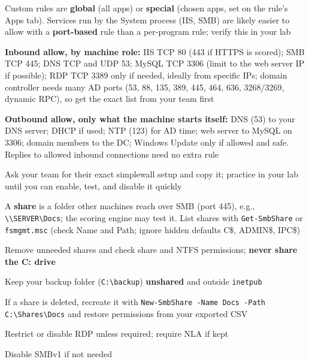 \documentclass[11pt]{article}
\newcommand{\cmd}[1]{\texttt{\small #1}}
\begin{document}
\begin{mycheck}
\begin{itemize}[itemsep=1pt, topsep=1pt]
  \end{itemize}
  \item Custom rules are \textbf{global} (all apps) or \textbf{special} (chosen apps, set on the rule's Apps tab). Services run by the System process (IIS, SMB) are likely easier to allow with a \textbf{port-based} rule than a per-program rule; verify this in your lab
  \item \textbf{Inbound allow, by machine role:} IIS TCP 80 (443 if HTTPS is scored); SMB TCP 445; DNS TCP and UDP 53; MySQL TCP 3306 (limit to the web server IP if possible); RDP TCP 3389 only if needed, ideally from specific IPs; domain controller needs many AD ports (53, 88, 135, 389, 445, 464, 636, 3268/3269, dynamic RPC), so get the exact list from your team first
  \item \textbf{Outbound allow, only what the machine starts itself:} DNS (53) to your DNS server; DHCP if used; NTP (123) for AD time; web server to MySQL on 3306; domain members to the DC; Windows Update only if allowed and safe. Replies to allowed inbound connections need no extra rule
  \item Ask your team for their exact simplewall setup and copy it; practice in your lab until you can enable, test, and disable it quickly
  \item A \textbf{share} is a folder other machines reach over SMB (port 445), e.g., \cmd{\textbackslash\textbackslash SERVER\textbackslash Docs}; the scoring engine may test it. List shares with \cmd{Get-SmbShare} or \cmd{fsmgmt.msc} (check Name and Path; ignore hidden defaults C\$, ADMIN\$, IPC\$)
  \item Remove unneeded shares and check share and NTFS permissions; \textbf{never share the C: drive}
  \item Keep your backup folder (\cmd{C:\textbackslash backup}) \textbf{unshared} and outside \cmd{inetpub}
  \item If a share is deleted, recreate it with \cmd{New-SmbShare -Name Docs -Path C:\textbackslash Shares\textbackslash Docs} and restore permissions from your exported CSV
  \item Restrict or disable RDP unless required; require NLA if kept
  \item Disable SMBv1 if not needed
\end{mycheck}
\end{document}
